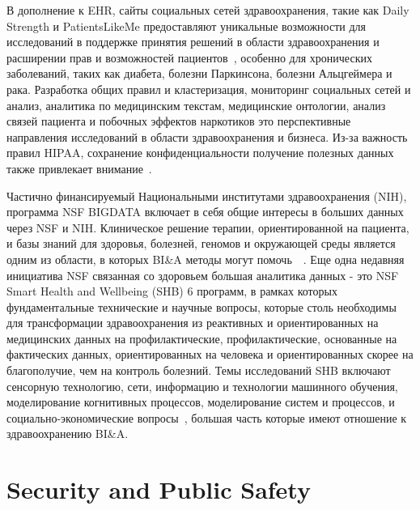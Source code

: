 В дополнение к EHR, сайты социальных сетей здравоохранения, такие как Daily
Strength и PatientsLikeMe предоставляют уникальные возможности для исследований
в поддержке принятия решений в области здравоохранения и расширении прав и возможностей пациентов~\cite{Miller:2012b}, особенно для хронических заболеваний, таких как
диабета, болезни Паркинсона, болезни Альцгеймера и рака. Разработка
общих правил и кластеризация, мониторинг социальных сетей
и анализ, аналитика по медицинским текстам, медицинские онтологии, анализ связей пациента и побочных эффектов наркотиков это
перспективные направления исследований в области здравоохранения и бизнеса. Из-за
важность правил HIPAA, сохранение конфиденциальности
получение полезных данных также привлекает внимание~\cite{Gelfand:2012}.

Частично финансируемый Национальными институтами здравоохранения (NIH),
программа NSF BIGDATA включает в себя общие
интересы в больших данных через NSF и NIH. Клиническое решение
терапии, ориентированной на пациента, и базы знаний для
здоровья, болезней, геномов и окружающей среды является одним из
области, в которых BI\&A методы могут помочь~\cite{Chen:2011b}~\cite{Wactlar:2011}. Еще одна недавняя инициатива NSF
связанная со здоровьем большая аналитика данных - это NSF Smart Health and Wellbeing (SHB) 6
программ, в рамках которых
фундаментальные технические и научные вопросы, которые
столь необходимы для трансформации здравоохранения из реактивных и
ориентированных на медицинских данных на профилактические, профилактические, основанные на фактических данных,
ориентированных на человека и ориентированных скорее на благополучие, чем на контроль болезний. Темы исследований SHB включают сенсорную технологию,
сети, информацию и технологии машинного обучения,
моделирование когнитивных процессов, моделирование систем и процессов,
и социально-экономические вопросы~\cite{Wactlar:2011}, большая часть
которые имеют отношение к здравоохранению BI\&A.

\section{Security and Public Safety}

